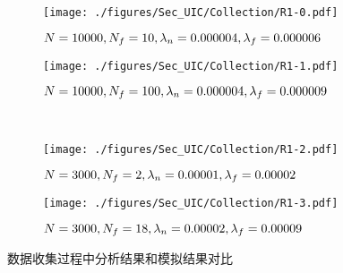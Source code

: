 
\begin{figure}[!h]
  \centering
  \begin{subfigure}[h]{0.48\linewidth}
    \centering
    \texttt{[image: ./figures/Sec\_UIC/Collection/R1-0.pdf]}
    \label{Figure_CollectionTestA}
    \vspace{-1.5em}
    \caption{$N=10000, N_f=10, \\\lambda_n=0.000004,\lambda_f=0.000006$}
  \end{subfigure}
  \begin{subfigure}[h]{0.48\linewidth}
    \centering
    \texttt{[image: ./figures/Sec\_UIC/Collection/R1-1.pdf]}
    \label{Figure_CollectionTestB}
    \vspace{-1.5em}
    \caption{$N=10000, N_f=100, \\\lambda_n=0.000004,\lambda_f=0.000009$}
  \end{subfigure}\\
  \begin{subfigure}[h]{0.48\linewidth}
    \centering
    \texttt{[image: ./figures/Sec\_UIC/Collection/R1-2.pdf]}
    \label{Figure_CollectionTestC}
    \vspace{-1.5em}
    \caption{$N=3000, N_f=2, \\\lambda_n=0.00001,\lambda_f=0.00002$}
  \end{subfigure}
  \begin{subfigure}[h]{0.48\linewidth}
    \centering
    \texttt{[image: ./figures/Sec\_UIC/Collection/R1-3.pdf]}
    \label{Figure_CollectionTestD}
    \vspace{-1.5em}
    \caption{$N=3000, N_f=18, \\\lambda_n=0.00002,\lambda_f=0.00009$}
  \end{subfigure}
  \vspace{-0.5em}
  \caption{数据收集过程中分析结果和模拟结果对比}
\label{Figure_CollectionTest}
\end{figure}


